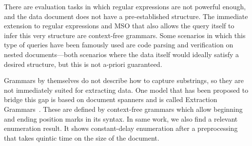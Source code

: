  
% 
% 
There are evaluation tasks in which regular expressions are not powerful enough, and the data document does not have a pre-established structure. The immediate extension to regular expressions and MSO that also allows the query itself to infer this very structure are context-free grammars. Some scenarios in which this type of queries have been famously used are code parsing and verification on nested documents---both scenarios where the data itself would ideally satisfy a desired structure, but this is not a-priori guaranteed. 

Grammars by themselves do not describe how to capture substrings, so they are not immediately suited for extracting data. One model that has been proposed to bridge this gap is based on document spanners and is called Extraction Grammars~\cite{Peterfreund21}. These are defined by context-free grammars which allow beginning and ending position marks in its syntax. 
 In same work, we also find a relevant enumeration result. It shows constant-delay enumeration after a preprocessing that takes quintic time on the size of the document.
 

